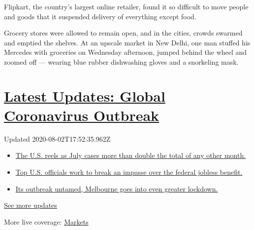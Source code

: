 Flipkart, the country's largest online retailer, found it so difficult
to move people and goods that it suspended delivery of everything except
food.

Grocery stores were allowed to remain open, and in the cities, crowds
swarmed and emptied the shelves. At an upscale market in New Delhi, one
man stuffed his Mercedes with groceries on Wednesday afternoon, jumped
behind the wheel and zoomed off --- wearing blue rubber dishwashing
gloves and a snorkeling mask.

\hypertarget{latest-updates-global-coronavirus-outbreak}{%
\section{\texorpdfstring{\href{https://www.nytimes.com/2020/08/01/world/coronavirus-covid-19.html?action=click\&pgtype=Article\&state=default\&region=MAIN_CONTENT_1\&context=storylines_live_updates}{Latest
Updates: Global Coronavirus
Outbreak}}{Latest Updates: Global Coronavirus Outbreak}}\label{latest-updates-global-coronavirus-outbreak}}

Updated 2020-08-02T17:52:35.962Z

\begin{itemize}
\tightlist
\item
  \href{https://www.nytimes.com/2020/08/01/world/coronavirus-covid-19.html?action=click\&pgtype=Article\&state=default\&region=MAIN_CONTENT_1\&context=storylines_live_updates\#link-34047410}{The
  U.S. reels as July cases more than double the total of any other
  month.}
\item
  \href{https://www.nytimes.com/2020/08/01/world/coronavirus-covid-19.html?action=click\&pgtype=Article\&state=default\&region=MAIN_CONTENT_1\&context=storylines_live_updates\#link-780ec966}{Top
  U.S. officials work to break an impasse over the federal jobless
  benefit.}
\item
  \href{https://www.nytimes.com/2020/08/01/world/coronavirus-covid-19.html?action=click\&pgtype=Article\&state=default\&region=MAIN_CONTENT_1\&context=storylines_live_updates\#link-2bc8948}{Its
  outbreak untamed, Melbourne goes into even greater lockdown.}
\end{itemize}

\href{https://www.nytimes.com/2020/08/01/world/coronavirus-covid-19.html?action=click\&pgtype=Article\&state=default\&region=MAIN_CONTENT_1\&context=storylines_live_updates}{See
more updates}

More live coverage:
\href{https://www.nytimes.com/live/2020/07/31/business/stock-market-today-coronavirus?action=click\&pgtype=Article\&state=default\&region=MAIN_CONTENT_1\&context=storylines_live_updates}{Markets}

